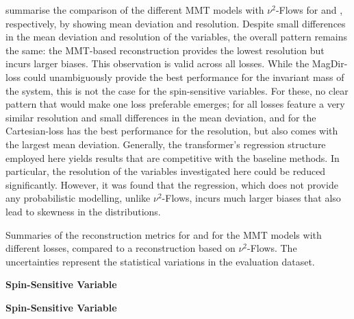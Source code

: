  summarise the comparison of the different MMT models with $\nu^2$-Flows for \chel and \chan, respectively, by showing mean deviation and resolution. Despite small differences in the mean deviation and resolution of the variables, the overall pattern remains the same: the MMT-based reconstruction provides the lowest resolution but incurs larger biases. This observation is valid across all losses. While the MagDir-loss could unambiguously provide the best performance for the invariant mass of the \ttbar system, this is not the case for the spin-sensitive variables. For these, no clear pattern that would make one loss preferable emerges; for \chel all losses feature a very similar resolution and small differences in the mean deviation, and for \chan the Cartesian-loss has the best performance for the resolution, but also comes with the largest mean deviation.
Generally, the transformer's regression structure employed here yields results that are competitive with the baseline methods. In particular, the resolution of the variables investigated here could be reduced significantly. However, it was found that the regression, which does not provide any probabilistic modelling, unlike $\nu^2$-Flows, incurs much larger biases that also lead to skewness in the distributions.
\begin{table}[H]
    \centering
    \caption{Summaries of the reconstruction metrics for \chel {} and \chan {} for the MMT models with different losses, compared to a reconstruction based on $\nu^2$-Flows. The uncertainties represent the statistical variations in the evaluation dataset. }
    \begin{subtable}{1.0\textwidth}
        \centering
        \caption{\textbf{Spin-Sensitive Variable} \chel}
        \label{tab:losses:chel_reco}
        
    \end{subtable}
    \begin{subtable}{1.0\textwidth}
        \centering
        \caption{\textbf{Spin-Sensitive Variable} \chan}
        \label{tab:losses:chan_reco}
        
    \end{subtable}
\end{table}%

